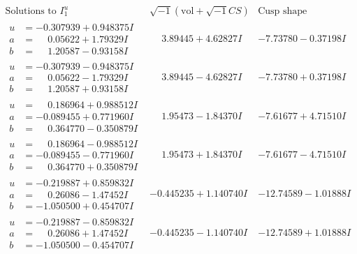 \documentclass[1p]{elsarticle_modified}
\theoremstyle{definition}
\newcommand{\I}{\sqrt{-1}}
\begin{document}
$$\begin{array}{c|c|c}  
\text{Solutions to }I^u_{1}& \I (\text{vol} + \sqrt{-1}CS) & \text{Cusp shape}\\
 \hline 
\begin{aligned}
u &= -0.307939 + 0.948375 I \\
a &= \phantom{-}0.05622 + 1.79329 I \\
b &= \phantom{-}1.20587 - 0.93158 I\end{aligned}
 & \phantom{-}3.89445 + 4.62827 I & -7.73780 - 0.37198 I \\ \hline\begin{aligned}
u &= -0.307939 - 0.948375 I \\
a &= \phantom{-}0.05622 - 1.79329 I \\
b &= \phantom{-}1.20587 + 0.93158 I\end{aligned}
 & \phantom{-}3.89445 - 4.62827 I & -7.73780 + 0.37198 I \\ \hline\begin{aligned}
u &= \phantom{-}0.186964 + 0.988512 I \\
a &= -0.089455 + 0.771960 I \\
b &= \phantom{-}0.364770 - 0.350879 I\end{aligned}
 & \phantom{-}1.95473 - 1.84370 I & -7.61677 + 4.71510 I \\ \hline\begin{aligned}
u &= \phantom{-}0.186964 - 0.988512 I \\
a &= -0.089455 - 0.771960 I \\
b &= \phantom{-}0.364770 + 0.350879 I\end{aligned}
 & \phantom{-}1.95473 + 1.84370 I & -7.61677 - 4.71510 I \\ \hline\begin{aligned}
u &= -0.219887 + 0.859832 I \\
a &= \phantom{-}0.26086 - 1.47452 I \\
b &= -1.050500 + 0.454707 I\end{aligned}
 & -0.445235 + 1.140740 I & -12.74589 - 1.01888 I \\ \hline\begin{aligned}
u &= -0.219887 - 0.859832 I \\
a &= \phantom{-}0.26086 + 1.47452 I \\
b &= -1.050500 - 0.454707 I\end{aligned}
 & -0.445235 - 1.140740 I & -12.74589 + 1.01888 I \\ \hline\begin{aligned}

\end{aligned}
\end{array}$$
\end{document}
